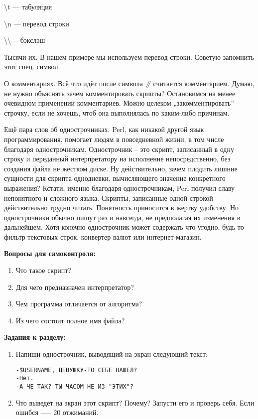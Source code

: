 \textbackslash t — табуляция

\textbackslash n — перевод строки

\textbackslash\textbackslash — бэкслэш

Тысячи их. В нашем примере мы используем перевод строки.
Советую запомнить этот спец. символ.

О комментариях. Всё что идёт после символа \emph{\#} считается комментарием.
Думаю, не нужно объяснять зачем комментировать скрипты? Остановимся на
менее очевидном применении комментариев. Можно целеком „закомментировать”
строчку, если не хочешь, чтоб она выполнялась по каким-либо причинам.

Ещё пара слов об однострочниках. Perl, как никакой другой язык
программирования, помогает людям в повседневной жизни, в том числе 
благодаря однострочникам. Однострочник -- это скрипт, записанный в одну
строку и переданный интерпретатору на исполнение непосредственно, без
создания файла не жестком диске. Ну действительно, зачем плодить лишние
сущности для скрипта-однодневки, вычисляющего значение конкретного
выражения? Кстати, именно благодаря однострочникам, Perl получил славу
непонятного и сложного языка. Скрипты, записанные одной строкой
действительно трудно читать. Понятность приносится в жертву удобству. Но %
однострочники обычно пишут раз и навсегда, не предполагая их изменения
в дальнейшем. Хотя конечно однострочник может содержать что угодно,
будь то фильтр текстовых строк, конвертер валют или интернет-магазин.

{\large{\textbf{Вопросы для самоконтроля:}}}

\begin{enumerate}
\item Что такое скрипт?
\item Для чего предназначен интерпретатор?
\item Чем программа отличается от алгоритма?
\item Из чего состоит полное имя файла?
\end{enumerate}

{\large{\textbf{Задания к разделу:}}}

\begin{enumerate}
\item Напиши однострочник, выводящий на экран следующий текст:
\begin{verbatim}
-$USERNAME, ДЕВУШКУ-ТО СЕБЕ НАШЕЛ?
-Нет.
-А ЧЕ ТАК? ТЫ ЧАСОМ НЕ ИЗ "ЭТИХ"?
\end{verbatim}
\item Что выведет на экран этот скрипт? Почему? Запусти его и проверь
себя. Если ошибся --— 20 отжиманий.
\end{enumerate}

